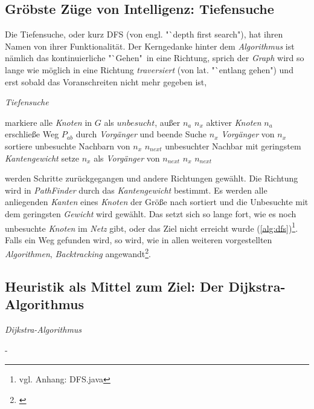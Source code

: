 \documentclass[12pt]{article}
\begin{document}
\subsection{Gröbste Züge von Intelligenz: Tiefensuche}
Die Tiefensuche, oder kurz DFS (von engl. "`depth first search"), hat ihren Namen von ihrer Funktionalität. Der Kerngedanke hinter dem \textit{Algorithmus} ist nämlich das kontinuierliche "`Gehen"\ in eine Richtung, sprich der \textit{Graph} wird so lange wie möglich in eine Richtung \textit{traversiert} (von lat. "`entlang gehen") und erst sobald das Voranschreiten nicht mehr gegeben ist, 
\begin{algorithm}
\caption{\textit{Tiefensuche} \label{alg:dfs}}
\begin{algorithmic}[1]
\Statex
{}
\Statex
{}
	\State markiere alle \textit{Knoten} in $G$ als $unbesucht$, außer $n_a$
	\State \sei $n_x$ aktiver \textit{Knoten} $n_a$
			\State erschließe Weg $P_{ab}$ durch \textit{Vorgänger} und beende Suche
		\EndIf
			\State \sei $n_x$ \textit{Vorgänger} von $n_x$
		\Else
			\State sortiere unbesuchte Nachbarn von $n_x$
			\State \sei $n_{next}$ unbesuchter Nachbar mit geringstem \textit{Kantengewicht}
			\State setze $n_x$ als \textit{Vorgänger} von $n_{next}$
			\State \sei $n_x$ $n_{next}$
		\EndIf
	\EndWhile
\EndProcedure
\end{algorithmic}
\end{algorithm}
werden Schritte zurückgegangen und andere Richtungen gewählt. Die Richtung wird in \textit{PathFinder} durch das \textit{Kantengewicht} bestimmt. Es werden alle anliegenden \textit{Kanten} eines \textit{Knoten} der Größe nach sortiert und die Unbesuchte mit dem geringsten \textit{Gewicht} wird gewählt. Das setzt sich so lange fort, wie es noch unbesuchte \textit{Knoten} im \textit{Netz} gibt, oder das Ziel nicht erreicht wurde (\autoref{alg:dfs})\footnote{vgl. Anhang: DFS.java}. Falls ein Weg gefunden wird, so wird, wie in allen weiteren vorgestellten \textit{Algorithmen}, \textit{Backtracking} angewandt\footnote{\cite[Kapitel 22.3, S. 457ff]{cormen}}.

\newpage

\subsection{Heuristik als Mittel zum Ziel: Der Dijkstra-Algorithmus}
\begin{algorithm}
\caption{\textit{Dijkstra-Algorithmus} \label{alg:dijkstra}}
\begin{algorithmic}[1]
\Statex
{}
\Statex
\end{algorithmic}
\end{algorithm}
\newpage
-
\newpage
\end{document}
